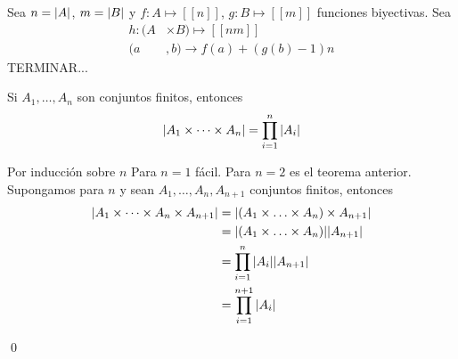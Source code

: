 	\begin{demostration}{}
		Sea $n=\abs{A}$, $m=\abs{B}$ y $f:A\longmapsto [[n]]$, $g:B\longmapsto [[m]]$ funciones biyectivas. Sea
		\begin{align*}
			h:(A&\times B)\longmapsto[[nm]] \\
			(a&,b)\longrightarrow f(a)+(g(b)-1)n
		\end{align*}
		TERMINAR...
	\end{demostration}
	\begin{corollary}{}
		Si $A_1,\dotso,A_n$ son conjuntos finitos, entonces 
		$$\abs{A_1\times\dotsb\times A_n}=\prod_{i=1}^{n}{\abs{A_i}}$$
	\end{corollary}
	\begin{demostration}{}
		Por inducción sobre $n$
		Para $n=1$ fácil.
		Para $n=2$ es el teorema anterior.
		Supongamos para $n$ y sean $A_1,\dotso,A_n,A_{n+1}$ conjuntos finitos, entonces
		\begin{align*}
			\abs{A_1\times\dotsb\times A_n\times A_{n+1}}&=\abs{(A_1\times\dotso\times A_n)\times A_{n+1}} \\
			&=\abs{(A_1\times\dotso\times A_n)}\abs{A_{n+1}}\\
			&=\prod_{i=1}^{n}{\abs{A_i}}\abs{A_{n+1}}\\
			&=\prod_{i=1}^{n+1}{\abs{A_i}}
		\end{align*}
		\begin{flushright}
			\qed
		\end{flushright}
	\end{demostration}